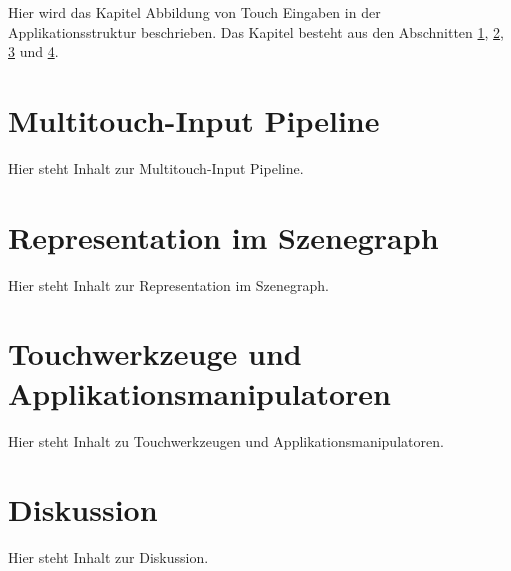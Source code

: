 Hier wird das Kapitel Abbildung von Touch Eingaben in der Applikationsstruktur beschrieben. Das Kapitel besteht aus den Abschnitten \ref{sec:multitouch_input_pipeline}, \ref{sec:representation_im_szenegraph}, \ref{sec:touchwerkzeuge_und_applikationsmanipulatoren} und \ref{sec:diskussion_applikationsstruktur}.


\section{Multitouch-Input Pipeline}
\label{sec:multitouch_input_pipeline}

Hier steht Inhalt zur Multitouch-Input Pipeline.


\section{Representation im Szenegraph}
\label{sec:representation_im_szenegraph}

Hier steht Inhalt zur Representation im Szenegraph.


\section{Touchwerkzeuge und Applikationsmanipulatoren}
\label{sec:touchwerkzeuge_und_applikationsmanipulatoren}

Hier steht Inhalt zu Touchwerkzeugen und Applikationsmanipulatoren.


\section{Diskussion}
\label{sec:diskussion_applikationsstruktur}

Hier steht Inhalt zur Diskussion.